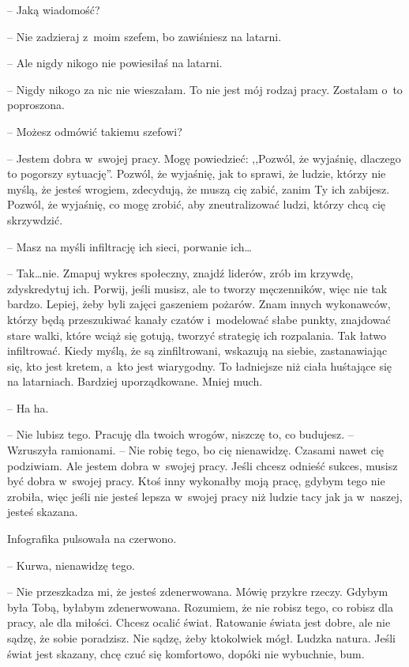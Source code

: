 \documentclass[oneside,polish,11pt,sfheadings]{mwbk}
\begin{document}
-- Jaką wiadomość?

-- Nie zadzieraj z~moim szefem, bo zawiśniesz na latarni.

-- Ale nigdy nikogo nie powiesiłaś na latarni.

-- Nigdy nikogo za nic nie wieszałam. To nie jest mój rodzaj pracy.
Zostałam o~to poproszona.

-- Możesz odmówić takiemu szefowi?

-- Jestem dobra w~swojej pracy. Mogę powiedzieć: ,,Pozwól, że wyjaśnię,
dlaczego to pogorszy sytuację''. Pozwól, że wyjaśnię, jak to sprawi, że
ludzie, którzy nie myślą, że jesteś wrogiem, zdecydują, że muszą cię
zabić, zanim Ty ich zabijesz. Pozwól, że wyjaśnię, co mogę zrobić, aby
zneutralizować ludzi, którzy chcą cię skrzywdzić.

-- Masz na myśli infiltrację ich sieci, porwanie ich\ldots 

-- Tak\ldots  nie. Zmapuj wykres społeczny, znajdź liderów, zrób im krzywdę,
zdyskredytuj ich. Porwij, jeśli musisz, ale to tworzy męczenników, więc
nie tak bardzo. Lepiej, żeby byli zajęci gaszeniem pożarów. Znam innych
wykonawców, którzy będą przeszukiwać kanały czatów i~modelować słabe
punkty, znajdować stare walki, które wciąż się gotują, tworzyć strategię
ich rozpalania. Tak łatwo infiltrować. Kiedy myślą, że są zinfiltrowani,
wskazują na siebie, zastanawiając się, kto jest kretem, a~kto jest
wiarygodny. To ładniejsze niż ciała huśtające się na latarniach.
Bardziej uporządkowane. Mniej much.

-- Ha ha.

-- Nie lubisz tego. Pracuję dla twoich wrogów, niszczę to, co budujesz. -- Wzruszyła ramionami. -- Nie robię tego, bo cię nienawidzę. Czasami nawet
cię podziwiam. Ale jestem dobra w~swojej pracy. Jeśli chcesz odnieść
sukces, musisz być dobra w~swojej pracy. Ktoś inny wykonałby moją pracę,
gdybym tego nie zrobiła, więc jeśli nie jesteś lepsza w~swojej pracy niż
ludzie tacy jak ja w~naszej, jesteś skazana.

Infografika pulsowała na czerwono. 

-- Kurwa, nienawidzę tego.

-- Nie przeszkadza mi, że jesteś zdenerwowana. Mówię przykre rzeczy.
Gdybym była Tobą, byłabym zdenerwowana. Rozumiem, że nie robisz tego, co
robisz dla pracy, ale dla miłości. Chcesz ocalić świat. Ratowanie świata
jest dobre, ale nie sądzę, że sobie poradzisz. Nie sądzę, żeby
ktokolwiek mógł. Ludzka natura. Jeśli świat jest skazany, chcę czuć się
komfortowo, dopóki nie wybuchnie, bum.
\end{document}
